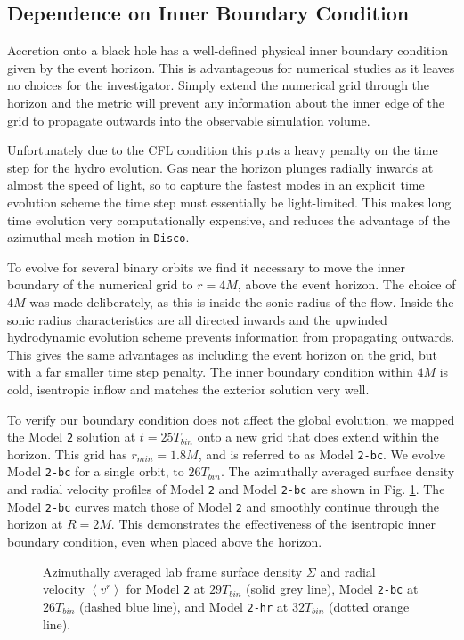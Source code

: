 \documentclass{emulateapj}
\newcommand{\Disco}{{\texttt{Disco}}}
\newcommand{\model}[1]{{Model \texttt{#1}}}
\newcommand{\ave}[1]{\left \langle #1 \right \rangle}
\begin{document}
\subsection{Dependence on Inner Boundary Condition}
\label{subsec:bc}

Accretion onto a black hole has a well-defined physical inner boundary condition given by the event horizon.  This is advantageous for numerical studies as it leaves no choices for the investigator. Simply extend the numerical grid through the horizon and the metric will prevent any information about the inner edge of the grid to propagate outwards into the observable simulation volume.  

Unfortunately due to the CFL condition this puts a heavy penalty on the time step for the hydro evolution.  Gas near the horizon plunges radially inwards at almost the speed of light, so to capture the fastest modes in an explicit time evolution scheme the time step must essentially be light-limited. This makes long time evolution very computationally expensive, and reduces the advantage of the azimuthal mesh motion in \Disco{}.

To evolve for several binary orbits we find it necessary to move the inner boundary of the numerical grid to $r=4M$, above the event horizon.  The choice of $4M$ was made deliberately, as this is inside the sonic radius of the flow. Inside the sonic radius characteristics are all directed inwards and the upwinded hydrodynamic evolution scheme prevents information from propagating outwards.  This gives the same advantages as including the event horizon on the grid, but with a far smaller time step penalty.  The inner boundary condition within $4M$ is cold, isentropic inflow and matches the exterior solution very well.

To verify our boundary condition does not affect the global evolution, we mapped the \model{2} solution at $t=25 T_{bin}$ onto a new grid that does extend within the horizon.  This grid has $r_{min} = 1.8M$, and is referred to as \model{2-bc}.  We evolve \model{2-bc} for a single orbit, to $26T_{bin}$.  The azimuthally averaged surface density and radial velocity profiles of \model{2} and \model{2-bc} are shown in Fig. \ref{fi:bc_hr_comp}.  The \model{2-bc} curves match those of \model{2} and smoothly continue through the horizon at $R=2M$.  This demonstrates the effectiveness of the isentropic inner boundary condition, even when placed above the horizon.

\begin{figure}
	\caption{\label{fi:bc_hr_comp} Azimuthally averaged lab frame surface density $\Sigma$ and radial velocity $\ave{v^r}$ for \model{2} at $29T_{bin}$ (solid grey line), \model{2-bc} at $26T_{bin}$ (dashed blue line), and \model{2-hr}  at $32T_{bin}$ (dotted orange line).}
\end{figure}
\end{document}
